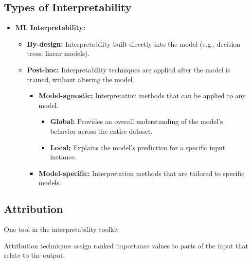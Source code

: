 \subsection{Types of Interpretability}
\begin{summary}
    \begin{itemize}
        \item \textbf{ML Interpretability:} 
        \begin{itemize}
            \item \textbf{By-design:} Interpretability built directly into the model (e.g., decision trees, linear models).
            \item \textbf{Post-hoc:} Interpretability techniques are applied after the model is trained, without altering the model.
            \begin{itemize}
                \item \textbf{Model-agnostic:} Interpretation methods that can be applied to any model.
                \begin{itemize}
                    \item \textbf{Global:} Provides an overall understanding of the model’s behavior across the entire dataset.
                    \item \textbf{Local:} Explains the model’s prediction for a specific input instance.
                \end{itemize}
                \item \textbf{Model-specific:} Interpretation methods that are tailored to specific models.
            \end{itemize}
        \end{itemize}
    \end{itemize}    
\end{summary}
\newpage

\subsection{Attribution}
\begin{motivation}
    One tool in the interpretability toolkit
\end{motivation}

\begin{definition}
    Attribution techniques assign ranked importance values to parts of the input that relate to the output. 
\end{definition}

